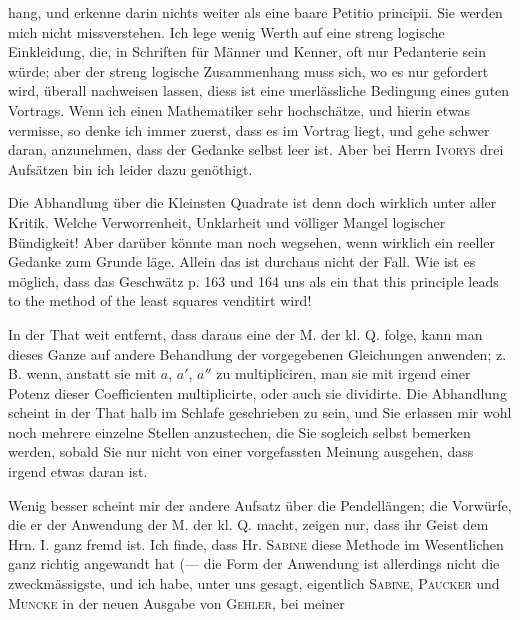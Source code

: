 hang, und erkenne darin nichts weiter als eine baare Petitio principii. Sie werden mich nicht missverstehen. Ich lege wenig Werth auf eine streng logische Einkleidung, die, in Schriften für Männer und Kenner, oft nur Pedanterie sein würde; aber der streng logische Zusammenhang muss sich, wo es nur gefordert wird, überall nachweisen lassen, diess ist eine unerlässliche Bedingung eines guten Vortrags. Wenn ich einen Mathematiker sehr hochschätze, und hierin etwas vermisse, so denke ich immer zuerst, dass es  im Vortrag liegt, und gehe schwer daran, anzunehmen, dass der Gedanke selbst leer ist. Aber bei Herrn \textsc{Ivorys} drei Aufsätzen bin ich leider dazu genöthigt.

Die Abhandlung über die Kleinsten Quadrate ist denn doch wirklich unter aller Kritik. Welche Verworrenheit, Unklarheit und völliger Mangel logischer Bündigkeit! Aber darüber könnte man noch wegsehen, wenn wirklich ein reeller Gedanke zum Grunde läge. Allein das ist durchaus nicht der Fall. Wie ist es möglich, dass das Geschwätz p. 163 und 164 uns als ein  that this principle leads  to the method of the least squares venditirt wird!

In der That weit entfernt, dass daraus eine  der M. der kl. Q. folge, kann man dieses Ganze auf  andere Behandlung der vorgegebenen Gleichungen anwenden; z. B. wenn, anstatt sie mit $a$, $a'$, $a''$ zu multipliciren, man sie mit irgend einer Potenz dieser Coefficienten multiplicirte, oder auch sie dividirte. Die Abhandlung scheint in der That halb im Schlafe geschrieben zu sein, und Sie erlassen mir wohl noch mehrere einzelne Stellen anzustechen, die Sie sogleich selbst bemerken werden, sobald Sie nur nicht von einer vorgefassten Meinung ausgehen, dass irgend etwas daran ist.

Wenig besser scheint mir der andere Aufsatz über die Pendellängen; die Vorwürfe, die er der Anwendung der M. der kl. Q. macht, zeigen nur, dass ihr Geist dem Hrn. I. ganz fremd ist. Ich finde, dass Hr. \textsc{Sabine} diese Methode im Wesentlichen ganz richtig angewandt hat (— die Form der Anwendung ist allerdings nicht die zweckmässigste, und ich habe, unter uns gesagt, eigentlich \textsc{Sabine}, \textsc{Paucker} und \textsc{Muncke} in der neuen Ausgabe von \textsc{Gehler}, bei meiner
